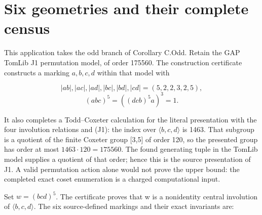 \section{Six geometries and their complete
census}\label{six-geometries-and-their-complete-census}

This application takes the odd branch of Corollary C.Odd. Retain the GAP
TomLib J1 permutation model, of order 175560. The construction
certificate constructs a marking \(a,b,c,d\) within that model with

\[
|ab|,|ac|,|ad|,|bc|,|bd|,|cd|=(5,2,2,3,2,5),
\] \[
(abc)^5=((dcb)^5a)^3=1.
\tag{J1}
\]

It also completes a Todd--Coxeter calculation for the literal
presentation with the four involution relations and (J1): the index over
\(\langle b,c,d\rangle\) is 1463. That subgroup is a quotient of the
finite Coxeter group {[}3,5{]} of order 120, so the presented group has
order at most \(1463·120=175560\). The found generating tuple in the
TomLib model supplies a quotient of that order; hence this is the source
presentation of J1. A valid permutation action alone would not prove the
upper bound: the completed exact coset enumeration is a charged
computational input.

Set \(w=(bcd)^5\). The certificate proves that w is a nonidentity
central involution of \(\langle b,c,d\rangle\). The six source-defined
markings and their exact invariants are:

